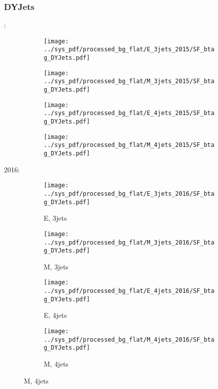 \documentclass{beamer}
\begin{document}
\begin{frame}
\frametitle{DYJets}
\fontsize{5}{1}:
\begin{figure}
\centering
\begin{subfigure}[b]{0.24\textwidth}
\texttt{[image: ../sys\_pdf/processed\_bg\_flat/E\_3jets\_2015/SF\_btag\_DYJets.pdf]}
\end{subfigure}
\begin{subfigure}[b]{0.24\textwidth}
\texttt{[image: ../sys\_pdf/processed\_bg\_flat/M\_3jets\_2015/SF\_btag\_DYJets.pdf]}
\end{subfigure}
\begin{subfigure}[b]{0.24\textwidth}
\texttt{[image: ../sys\_pdf/processed\_bg\_flat/E\_4jets\_2015/SF\_btag\_DYJets.pdf]}
\end{subfigure}
\begin{subfigure}[b]{0.24\textwidth}
\texttt{[image: ../sys\_pdf/processed\_bg\_flat/M\_4jets\_2015/SF\_btag\_DYJets.pdf]}
\end{subfigure}
\end{figure}
2016:
\begin{figure}
\centering
\begin{subfigure}[b]{0.24\textwidth}
\texttt{[image: ../sys\_pdf/processed\_bg\_flat/E\_3jets\_2016/SF\_btag\_DYJets.pdf]}
\captionsetup{font=tiny}
\caption{E, 3jets}
\end{subfigure}
\begin{subfigure}[b]{0.24\textwidth}
\texttt{[image: ../sys\_pdf/processed\_bg\_flat/M\_3jets\_2016/SF\_btag\_DYJets.pdf]}
\captionsetup{font=tiny}
\caption{M, 3jets}
\end{subfigure}
\begin{subfigure}[b]{0.24\textwidth}
\texttt{[image: ../sys\_pdf/processed\_bg\_flat/E\_4jets\_2016/SF\_btag\_DYJets.pdf]}
\captionsetup{font=tiny}
\caption{E, 4jets}
\end{subfigure}
\begin{subfigure}[b]{0.24\textwidth}
\texttt{[image: ../sys\_pdf/processed\_bg\_flat/M\_4jets\_2016/SF\_btag\_DYJets.pdf]}
\captionsetup{font=tiny}
\caption{M, 4jets}
\end{subfigure}
\end{figure}
\end{frame}
\end{document}
